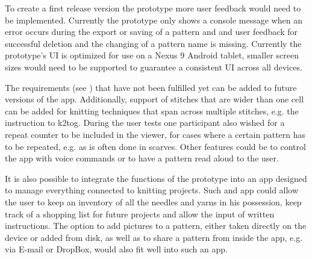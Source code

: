 To create a first release version the prototype more user feedback would need to be implemented. Currently the prototype only shows a console message when an error occurs during the export or saving of a pattern and and user feedback for successful deletion and the changing of a pattern name is missing. Currently the prototype's \gls{UI} is optimized for use on a Nexus 9 Android tablet, smaller screen sizes would need to be supported to guarantee a consistent \gls{UI} across all devices. 

The requirements (see ) that have not been fulfilled yet can be added to future versions of the app. Additionally, support of stitches that are wider than one cell can be added for knitting techniques that span across multiple stitches, e.g. the instruction to \gls{k2tog}. During the user tests one participant also wished for a repeat counter to be included in the viewer, for cases where a certain pattern has to be repeated, e.g. as is often done in scarves. Other features could be to control the app with voice commands or to have a pattern read aloud to the user.  

It is also possible to integrate the functions of the prototype into an app designed to manage everything connected to knitting projects. Such and app could allow the user to keep an inventory of all the needles and yarns in his possession, keep track of a shopping list for future projects and allow the input of written instructions. The option to add pictures to a pattern, either taken directly on the device or added from disk, as well as to share a pattern from inside the app, e.g. via E-mail or DropBox, would also fit well into such an app. 
